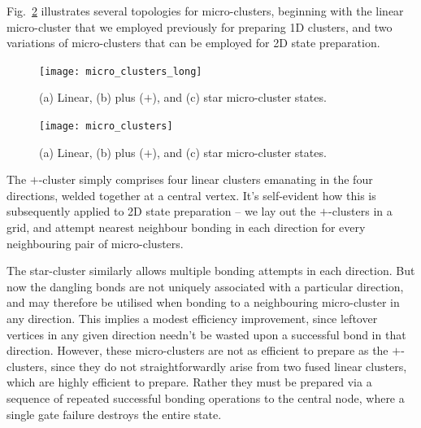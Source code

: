 Fig.~\ref{fig:micro_clusters} illustrates several topologies for micro-clusters, beginning with the linear micro-cluster that we employed previously for preparing 1D clusters, and two variations of micro-clusters that can be employed for 2D state preparation.

\pubmode
\begin{figure}[!htbp]
\texttt{[image: micro\_clusters\_long]}
\captionspacefig \caption{(a) Linear, (b) plus ($+$), and (c) star micro-cluster states.}\label{fig:micro_clusters}
\end{figure}
\else
\begin{figure}[!htbp]
\texttt{[image: micro\_clusters]}
\captionspacefig \caption{(a) Linear, (b) plus ($+$), and (c) star micro-cluster states.}\label{fig:micro_clusters}
\end{figure}
\fi

The $+$-cluster simply comprises four linear clusters emanating in the four directions, welded together at a central vertex. It's self-evident how this is subsequently applied to 2D state preparation -- we lay out the $+$-clusters in a grid, and attempt nearest neighbour bonding in each direction for every neighbouring pair of micro-clusters.

The star-cluster similarly allows multiple bonding attempts in each direction. But now the dangling bonds are not uniquely associated with a particular direction, and may therefore be utilised when bonding to a neighbouring micro-cluster in any direction. This implies a modest efficiency improvement, since leftover vertices in any given direction needn't be wasted upon a successful bond in that direction. However, these micro-clusters are not as efficient to prepare as the $+$-clusters, since they do not straightforwardly arise from two fused linear clusters, which are highly efficient to prepare. Rather they must be prepared via a sequence of repeated successful bonding operations to the central node, where a single gate failure destroys the entire state.

